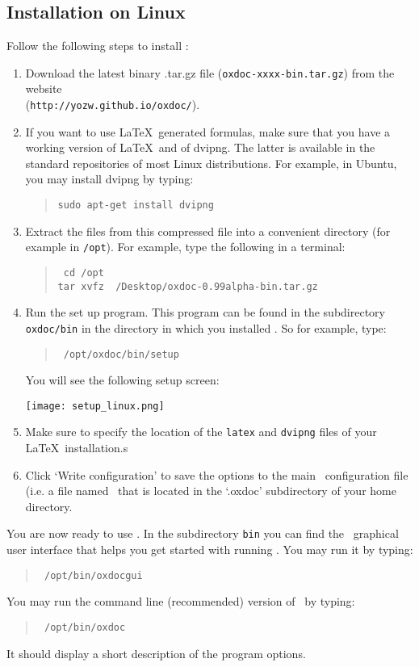 \subsection{Installation on Linux}
Follow the following steps to install \oxdoc:
\begin{enumerate}
\item Download the latest binary .tar.gz file ({\tt oxdoc-xxxx-bin.tar.gz}) from
the website \\({\tt http://yozw.github.io/oxdoc/}). 
\item If you want to use \LaTeX~generated formulas, make sure that you have a working
version of \LaTeX~and of dvipng. The latter is available in the standard repositories of most Linux distributions.
For example, in Ubuntu, you may install dvipng by typing:
\begin{quote}
\tt sudo apt-get install dvipng
\end{quote}
\item Extract the files from this compressed file into a convenient directory
(for example in {\tt /opt}). For example, type the following in a terminal:
\begin{quote} \tt
cd /opt\\
tar xvfz ~/Desktop/oxdoc-0.99alpha-bin.tar.gz
\end{quote}
\item Run the set up program. This program can be found in the subdirectory {\tt oxdoc/bin}
in the directory in which you installed \oxdoc. So for example, type:
\begin{quote} \tt
/opt/oxdoc/bin/setup
\end{quote}
You will see the following setup screen:
\begin{center}
\texttt{[image: setup\_linux.png]}
\end{center}
\item Make sure to specify the location of the {\tt latex} and {\tt dvipng} files
of your \LaTeX~installation.s
\item Click `Write configuration' to save the options to the main \oxdoc~configuration file
(i.e. a file named \oxdocxml~that is located in the `.oxdoc' subdirectory of your home directory.
\end{enumerate}

You are now ready to use \oxdoc. In the subdirectory {\tt bin}
you can find the \oxdoc~graphical user interface that helps you get started
with running \oxdoc. You may run it by typing:
\begin{quote}\tt
/opt/bin/oxdocgui
\end{quote}
You may run the command line (recommended) version of \oxdoc~by typing:
\begin{quote}\tt
/opt/bin/oxdoc
\end{quote}
It should display a short description of the program options.



